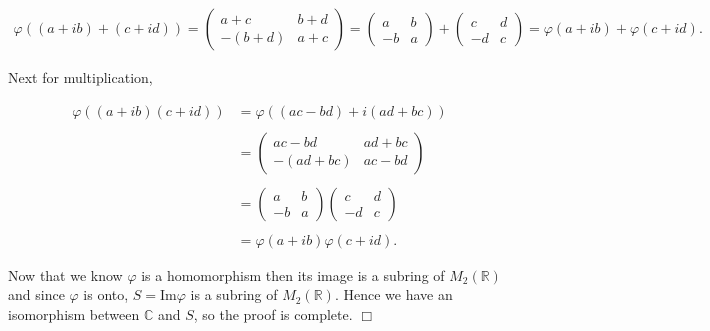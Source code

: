 \documentclass[11pt]{article}
\begin{document}
\begin{enumerate}
\begin{align*}
	\varphi((a+ib)+(c+id))=\begin{pmatrix}
		a+c & b+d \\ -(b+d) & a+c
	\end{pmatrix} = \begin{pmatrix}
		a & b \\ -b & a
	\end{pmatrix}+\begin{pmatrix}
		c & d \\ -d & c
	\end{pmatrix} = \varphi(a+ib)+\varphi(c+id).
\end{align*}

Next for multiplication,

\begin{align*}
	\varphi((a+ib)(c+id))&=\varphi((ac-bd)+i(ad+bc)) \\\\
	&= \begin{pmatrix}
		ac-bd & ad+bc \\ -(ad+bc) & ac-bd
	\end{pmatrix} \\\\
	&= \begin{pmatrix}
		a & b \\ -b & a
	\end{pmatrix}\begin{pmatrix}
		c & d \\ -d & c
	\end{pmatrix} \\\\
	&= \varphi(a+ib)\varphi(c+id).
\end{align*}

Now that we know $\varphi$ is a homomorphism then its image is a subring of $M_2(\mathbb R)$ and since $\varphi$ is onto, $S=\text{Im}\varphi$ is a subring of $M_2(\mathbb R)$.  Hence we have an isomorphism between $\mathbb C$ and $S$, so the proof is complete. $\Box$

\end{enumerate}
\end{document}
